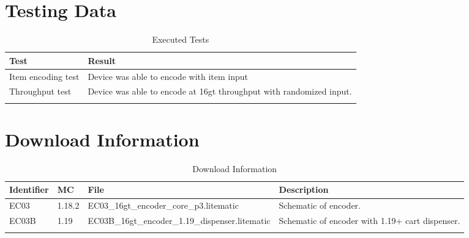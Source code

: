 \documentclass[10pt]{datasheet}
\begin{document}
\section{Testing Data}
\begin{table}[h]
\caption{Executed Tests}
\begin{tabularx}{\textwidth}{l | X}
    \thickhline
    \textbf{Test} & \textbf{Result} \\
    \hline
    Item encoding test & Device was able to encode with item input \\
    \hline
    Throughput test & Device was able to encode at 16gt throughput with randomized input. \\
    \thickhline
\end{tabularx}
\end{table}

\section{Download Information}
\begin{table}[h]
    \caption{Download Information}
    \begin{tabularx}{\textwidth}{l | l | l | X}
        \thickhline
        \textbf{Identifier} & \textbf{MC} & \textbf{File} & \textbf{Description} \\
        \hline
        EC03 & 1.18.2 & EC03\_16gt\_encoder\_core\_p3.litematic & Schematic of encoder. \\
        \hline
        EC03B & 1.19 & EC03B\_16gt\_encoder\_1.19\_dispenser.litematic & Schematic of encoder with 1.19+ cart dispenser. \\
        \thickhline
    \end{tabularx}
\end{table}
\end{document}
